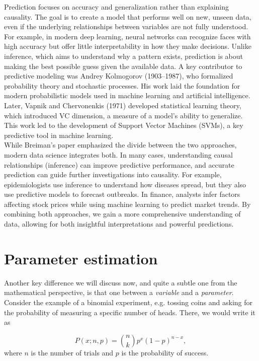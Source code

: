 \documentclass{book}
\begin{document}
Prediction focuses on accuracy and generalization rather than explaining causality. The goal is to create a model that performs well on new, unseen data, even if the underlying relationships between variables are not fully understood. For example, in modern deep learning, neural networks can recognize faces with high accuracy but offer little interpretability in how they make decisions. Unlike inference, which aims to understand why a pattern exists, prediction is about making the best possible guess given the available data. A key contributor to predictive modeling was Andrey Kolmogorov (1903–1987), who formalized probability theory and stochastic processes. His work laid the foundation for modern probabilistic models used in machine learning and artificial intelligence. Later, Vapnik and Chervonenkis (1971) developed statistical learning theory, which introduced VC dimension, a measure of a model’s ability to generalize. This work led to the development of Support Vector Machines (SVMs), a key predictive tool in machine learning.\\

While Breiman’s paper emphasized the divide between the two approaches, modern data science integrates both. In many cases, understanding causal relationships (inference) can improve predictive performance, and accurate prediction can guide further investigations into causality. For example, epidemiologists use inference to understand how diseases spread, but they also use predictive models to forecast outbreaks. In finance, analysts infer factors affecting stock prices while using machine learning to predict market trends. By combining both approaches, we gain a more comprehensive understanding of data, allowing for both insightful interpretations and powerful predictions.

\section{Parameter estimation}
Another key difference we will discuss now, and quite a subtle one from the mathematical perspective, is that one between a \textit{variable} and a \textit{parameter}. Consider the example of a binomial experiment, e.g. tossing coins and asking for the probability of measuring a specific number of heads. There, we would write it as 

\begin{equation}
    P(x; n, p) = \binom{n}{k} p^x (1-p)^{n-x},
\end{equation}
where $n$ is the number of trials and $p$ is the probability of success.
\end{document}
